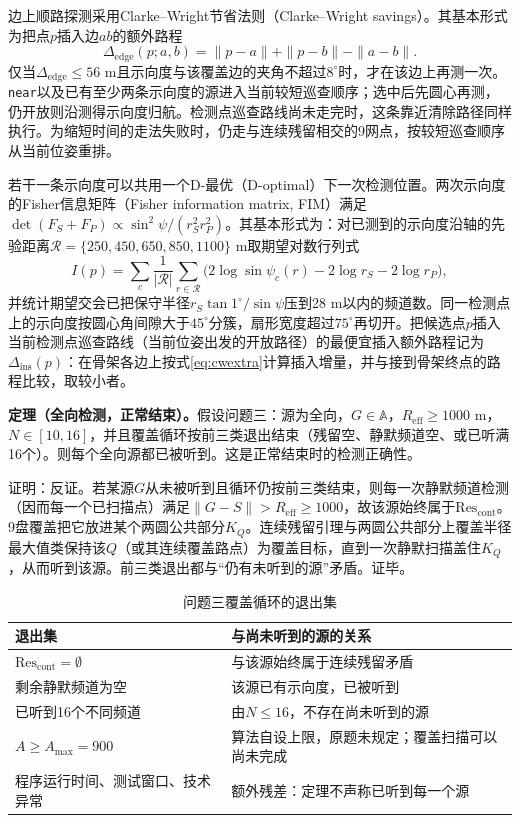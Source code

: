 \documentclass{cumcmthesis}
\begin{document}
边上顺路探测采用Clarke--Wright节省法则（Clarke--Wright savings）\cite{clarke1964}。其基本形式为把点$p$插入边$ab$的额外路程
\begin{equation}
\Delta_{\mathrm{edge}}(p;a,b)=\|p-a\|+\|p-b\|-\|a-b\|.
\label{eq:cwextra}
\end{equation}
仅当$\Delta_{\mathrm{edge}}\le 56$ m且示向度与该覆盖边的夹角不超过$8^\circ$时，才在该边上再测一次。\texttt{near}以及已有至少两条示向度的源进入当前较短巡查顺序；选中后先圆心再测，仍开放则沿测得示向度归航。检测点巡查路线尚未走完时，这条靠近清除路径同样执行。为缩短时间的走法失败时，仍走与连续残留相交的9网点，按较短巡查顺序从当前位姿重排。

若干一条示向度可以共用一个D-最优（D-optimal）下一次检测位置\cite{bishop2010}。两次示向度的Fisher信息矩阵（Fisher information matrix, FIM）满足$\det(F_S+F_P)\propto\sin^2\psi/(r_S^2 r_P^2)$。其基本形式为：对已测到的示向度沿轴的先验距离$\mathcal{R}=\{250,450,650,850,1100\}$ m取期望对数行列式
\begin{equation}
I(p)=\sum_{c}\frac{1}{|\mathcal{R}|}\sum_{r\in\mathcal{R}}\bigl(2\log\sin\psi_c(r)-2\log r_S-2\log r_P\bigr),
\label{eq:dopt}
\end{equation}
并统计期望交会已把保守半径$r_S\tan 1^\circ/\sin\psi$压到28 m以内的频道数。同一检测点上的示向度按圆心角间隙大于$45^\circ$分簇，扇形宽度超过$75^\circ$再切开。把候选点$p$插入当前检测点巡查路线（当前位姿出发的开放路径）的最便宜插入额外路程记为$\Delta_{\mathrm{ins}}(p)$：在骨架各边上按式\eqref{eq:cwextra}计算插入增量，并与接到骨架终点的路程比较，取较小者。

\textbf{定理（全向检测，正常结束）。}假设问题三：源为全向，$G\in\mathbb{A}$，$R_{\mathrm{eff}}\ge 1000$ m，$N\in[10,16]$，并且覆盖循环按前三类退出结束（残留空、静默频道空、或已听满16个）。则每个全向源都已被听到。这是正常结束时的检测正确性。

证明：反证。若某源$G$从未被听到且循环仍按前三类结束，则每一次静默频道检测（因而每一个已扫描点）满足$\|G-S\|>R_{\mathrm{eff}}\ge 1000$，故该源始终属于$\mathrm{Res}_{\mathrm{cont}}$。9盘覆盖把它放进某个两圆公共部分$K_Q$。连续残留引理与两圆公共部分上覆盖半径最大值类保持该$Q$（或其连续覆盖路点）为覆盖目标，直到一次静默扫描盖住$K_Q$，从而听到该源。前三类退出都与“仍有未听到的源”矛盾。证毕。

\begin{table}[htbp]
\centering
\caption{问题三覆盖循环的退出集}
\label{tab:q3exit}
\begin{tabular}{>{\raggedright\arraybackslash}p{}>{\raggedright\arraybackslash}p{}}
\toprule
退出集 & 与尚未听到的源的关系 \\
\midrule
$\mathrm{Res}_{\mathrm{cont}}=\emptyset$ & 与该源始终属于连续残留矛盾 \\
剩余静默频道为空 & 该源已有示向度，已被听到 \\
已听到16个不同频道 & 由$N\le 16$，不存在尚未听到的源 \\
$A\ge A_{\max}=900$ & 算法自设上限，原题未规定；覆盖扫描可以尚未完成 \\
程序运行时间、测试窗口、技术异常 & 额外残差：定理不声称已听到每一个源 \\
\bottomrule
\end{tabular}
\end{table}
\end{document}
